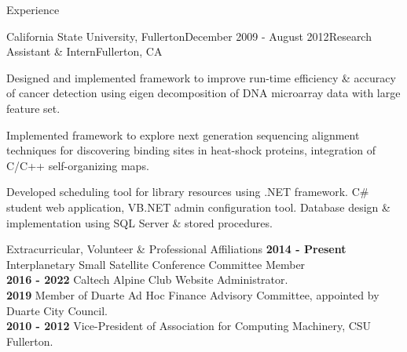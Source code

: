 \documentclass{resume} %
\begin{document}
\begin{rSection}{Experience}
\begin{rSubsection}{California State University, Fullerton}{December 2009 - August 2012}{Research Assistant \& Intern}{Fullerton, CA}
\item Designed and implemented framework to improve run-time efficiency \& accuracy of cancer detection using eigen decomposition of DNA microarray data with large feature set.
\item Implemented framework to explore next generation sequencing alignment techniques for discovering binding sites in heat-shock proteins, integration of C/C++ self-organizing maps.
\item Developed scheduling tool for library resources using .NET framework. C\# student web application, VB.NET admin configuration tool. Database design \& implementation using SQL Server \& stored procedures.
\end{rSubsection}
\end{rSection}


\begin{rSection}{ Extracurricular, Volunteer \& Professional Affiliations}
{\bf 2014 - Present} Interplanetary Small Satellite Conference Committee Member\\
{\bf 2016 - 2022} Caltech Alpine Club Website Administrator. \\
{\bf 2019} Member of Duarte Ad Hoc Finance Advisory Committee, appointed by Duarte City Council. \\
{\bf 2010 - 2012} Vice-President of Association for Computing Machinery, CSU Fullerton. 
\end{rSection}





\end{document}
